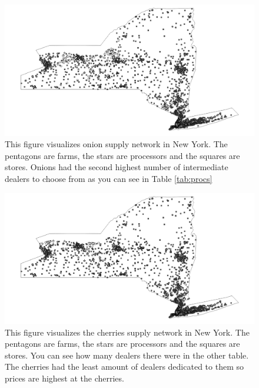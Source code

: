 \documentclass{report}
\begin{document}
\begin{figure}
\centering
\begin{framed}
\includegraphics[scale=.50]{network_49}
\caption{This figure visualizes onion supply network in New York. The pentagons are farms, the stars are processors and the squares are stores. Onions had the second highest number of intermediate dealers to choose from as you can see in Table \ref{tab:procs}}
\label{fig:network_49}
\end{framed}
\end{figure}

\begin{figure}
\centering
\begin{framed}
\includegraphics[scale=.50]{network_66}
\caption{This figure visualizes the cherries supply network in New York. The pentagons are farms, the stars are processors and the squares are stores. You can see how many dealers there were in the other table. The cherries had the least amount of dealers dedicated to them so prices are highest at the cherries.}
\label{fig:network_66}
\end{framed}
\end{figure}
\end{document}
